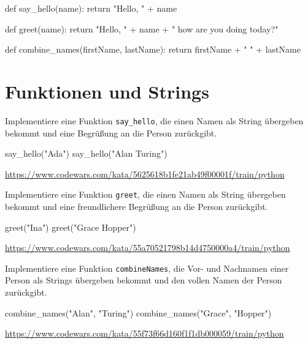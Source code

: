 \documentclass[class=scrartcl, crop=false]{standalone}
\newcommand{\expandpyconc}[1]{\expandafter\reallyexpandpyconc\expandafter{#1}}
\newcommand{\reallyexpandpyconc}[1]{\pyconc{exec(compile(open('#1', 'rb').read(), '#1', 'exec'))}}
\newenvironment{pyconcodeblck}[1]
{\newcommand{\snippetfile}{snippet-#1.py}
	\VerbatimEnvironment
	\begin{VerbatimOut}{\snippetfile}}
	{\end{VerbatimOut}
	\expandpyconc{\snippetfile}}
\begin{document}
\begin{pyconcodeblck}{funktionen_und_strings}
def say_hello(name):
    return "Hello, " + name
    
def greet(name):
    return "Hello, " + name + " how are you doing today?"




def combine_names(firstName, lastName):
    return firstName + " " + lastName
\end{pyconcodeblck}



\section{Funktionen und Strings}


\begin{aufgabe} \noindent
Implementiere eine Funktion \texttt{say_hello}, die einen Namen als String übergeben bekommt und eine Begrüßung an die Person zurückgibt.

\begin{pyconsole}
say_hello("Ada")
say_hello("Alan Turing")
\end{pyconsole}

\noindent\url{https://www.codewars.com/kata/5625618b1fe21ab49f00001f/train/python}
\end{aufgabe}



\begin{aufgabe} \noindent
Implementiere eine Funktion \texttt{greet}, die einen Namen als String übergeben bekommt und eine freundlichere Begrüßung an die Person zurückgibt.
	
\begin{pyconsole}
greet("Ina")
greet("Grace Hopper")
\end{pyconsole}
	
\noindent\noindent\url{https://www.codewars.com/kata/55a70521798b14d4750000a4/train/python}
\end{aufgabe}


\begin{aufgabe} \noindent
Implementiere eine Funktion \texttt{combineNames}, die Vor- und Nachnamen einer Person als Strings übergeben bekommt und den vollen Namen der Person zurückgibt.
	
\begin{pyconsole}
combine_names("Alan", "Turing")
combine_names("Grace", "Hopper")
\end{pyconsole}
	
\noindent\url{https://www.codewars.com/kata/55f73f66d160f1f1db000059/train/python}
\end{aufgabe}
\end{document}
